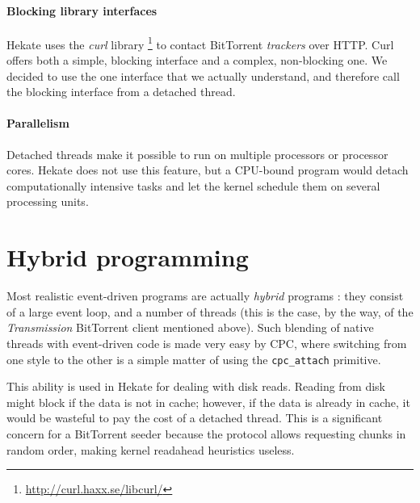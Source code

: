 \documentclass{easychair}
\begin{document}
\paragraph{Blocking library interfaces}
Hekate uses the \textit{curl} library
\footnote{\url{http://curl.haxx.se/libcurl/}} to contact BitTorrent
\emph{trackers} over HTTP.  Curl offers both a simple, blocking
interface and a complex, non-blocking one.  We decided to use the one
interface that we actually understand, and therefore call the blocking
interface from a detached thread.

\paragraph{Parallelism}
Detached threads make it possible to run on multiple processors or
processor cores.  Hekate does not use this feature, but a CPU-bound program
would detach computationally intensive tasks and let the kernel schedule
them on several processing units.

\section{Hybrid programming}
\label{sec:hybrid-threads}

Most realistic event-driven programs are actually \emph{hybrid} programs
\cite{pai,welsh}: they consist of a large event loop, and a number of
threads (this is the case, by the way, of the \emph{Transmission}
BitTorrent client mentioned above).  Such blending of native threads
with event-driven code is made very easy by CPC, where switching from
one style to the other is a simple matter of using the \verb|cpc_attach|
primitive.

This ability is used in Hekate for dealing with disk reads.  Reading from
disk might block if the data is not in cache; however, if the data is
already in cache, it would be wasteful to pay the cost of a detached
thread.  This is a significant concern for a BitTorrent seeder because
the protocol allows requesting chunks in random order, making kernel
readahead heuristics useless.
\end{document}

